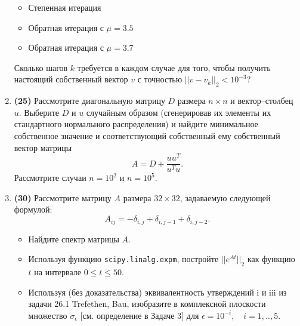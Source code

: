 \documentclass[prb,papersize=a4paper,notitlepage]{revtex4-1}%
\begin{document}
\begin{enumerate}
\begin{itemize}
\item Степенная итерация
\item Обратная итерация с $\mu = 3.5$
\item Обратная итерация с $\mu = 3.7$
\end{itemize}
Сколько шагов $k$ требуется в каждом случае для того, чтобы получить настоящий собственный вектор $v$ с точностью $||v-v_k||_2 < 10^{-3}$?
\item \textbf{(25)} Рассмотрите диагональную матрицу $D$ размера $n\times n$ и вектор--столбец $u$. Выберите $D$ и $u$ случайным образом (сгенерировав их элементы их стандартного нормального распределения) и найдите минимальное собственное значение и соответствующий собственный ему собственный вектор матрицы
$$A = D + \frac{u u^T}{u^T u}.$$ Рассмотрите случаи $n=10^2$ и $n=10^5$.
\item \textbf{(30)} Рассмотрите матрицу $A$ размера $32\times 32$, задаваемую следующей формулой:
$$
A_{ij} = -\delta_{i,j} + \delta_{i, j-1} + \delta_{i, j-2}.
$$
\begin{itemize}
\item Найдите спектр матрицы $A$.
\item Используя функцию \lstinline{scipy.linalg.expm}, постройте $||e^{At}||_2$ как функцию $t$ на интервале $0\le t \le 50$.
\item Используя (без доказательства) эквивалентность утверждений i и iii из задачи 26.1 Trefethen, Bau, изобразите в комплексной плоскости множество $\sigma_\epsilon$ [см. определение в Задаче 3] для $\epsilon = 10^{-i},\quad i=1,..,5$.
\end{itemize}
\end{enumerate}
\end{document}
